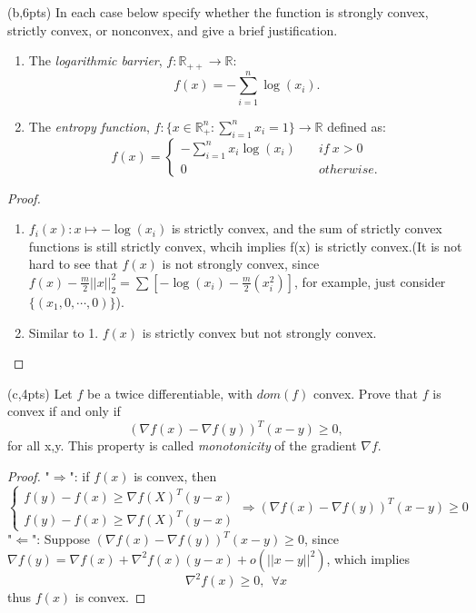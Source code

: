 \documentclass{article}     %
\begin{document}
(b,6pts) In each case below specify whether the function is strongly convex, strictly convex, or nonconvex, and give a brief justification.
\begin{enumerate}
    \item The \emph{logarithmic barrier}, $f: \mathbb{R}_{++}\rightarrow  \mathbb{R}$:
\[ f(x) = -\sum_{i=1}^{n} \log(x_i).  \]
    \item The \emph{entropy function}, $f:\{x\in  \mathbb{R}_+^n: \sum_{i=1}^{n}x_i=1\}\rightarrow  \mathbb{R}$ defined as:
    \[ 
    f(x)=\left\{ 
    \begin{array}{cc}
     -\sum_{i=1}^{n} x_i\log(x_i) & \quad if ~x>0\\
     0 &\quad otherwise.
     \end{array}  \right.
     \]
\end{enumerate}

\begin{proof}
\begin{enumerate}
\item $f_i(x):x\mapsto -\log(x_i)$ is strictly convex, and the sum of strictly convex functions is still strictly convex, whcih implies f(x) is strictly convex.(It is not hard to see that $f(x)$ is not strongly convex, since $f(x)-\frac{m}{2}||x||_2^2=\sum [-\log(x_i)-\frac{m}{2}(x_i^2)]$, for example, just consider $\{(x_1,0,\cdots,0)\}$).

\item Similar to 1. $f(x)$ is strictly convex but not strongly convex.
\end{enumerate}
\end{proof}

(c,4pts) Let $f$ be a twice differentiable, with $dom(f)$ convex. Prove that $f$ is convex if and only if 
\[ (\nabla f(x)-\nabla f(y))^T(x-y)\geq 0
,\]
for all x,y. This property is called \emph{monotonicity} of the gradient $\nabla f$.

\begin{proof}
"$\Rightarrow$": if $f(x)$ is convex, then
\[\left\{
\begin{array}{c}
f(y)-f(x)\geq \nabla f(X)^T(y-x)\\
f(y)-f(x)\geq \nabla f(X)^T(y-x)
\end{array}\right.
\Rightarrow (\nabla f(x)-\nabla f(y))^T(x-y)\geq 0\]
"$\Leftarrow$": Suppose  $(\nabla f(x)-\nabla f(y))^T(x-y)\geq 0$, since $\nabla f(y)=\nabla f(x)+\nabla^2 f(x)(y-x)+o(||x-y||^2)$, which implies
\[\nabla^2 f(x)\geq 0,~~\forall x\]
thus $f(x)$ is convex.


\end{proof}
\end{document}
